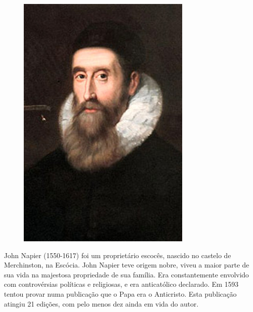 \begin{figure}
    \setlength{\intextsep}{0pt}
    \vspace{-1.5em} 
    \centering
    \includegraphics[width=\linewidth]{img/napier.jpg} 
\end{figure}

John Napier (1550-1617) foi um proprietário escocês, nascido no castelo de Merchinston, na Escócia. John Napier teve origem nobre, viveu a maior parte de sua vida na majestosa propriedade de sua família. Era constantemente envolvido com controvérsias políticas e religiosas, e era anticatólico declarado. Em 1593 tentou provar numa publicação que o Papa era o Anticristo. Esta publicação atingiu 21 edições, com pelo menos dez ainda em vida do autor.

